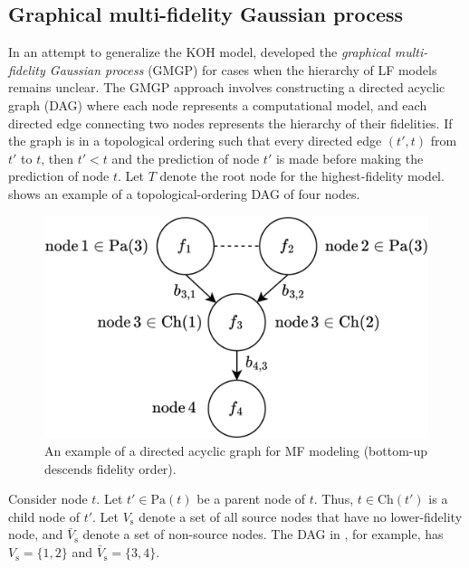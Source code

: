 \documentclass[iicol,sn-basic]{sn-jnl}%
\begin{document}
\subsection{Graphical multi-fidelity Gaussian process}\label{Sec43}

In an attempt to generalize the KOH model, \cite{Ji2023} developed the \textit{graphical multi-fidelity Gaussian process} (GMGP) for cases when the hierarchy of LF models remains unclear.
The GMGP approach involves constructing a directed acyclic graph (DAG) where each node represents a computational model, and each directed edge connecting two nodes represents the hierarchy of their fidelities.
If the graph is in a topological ordering such that every directed edge $(t',t)$ from $t'$ to $t$, then $t'<t$ and the prediction of node $t'$ is made before making the prediction of node $t$.  
Let $T$ denote the root node for the highest-fidelity model.
 shows an example of a topological-ordering DAG of four nodes.

\begin{figure}
	\centering
	\includegraphics[scale=0.85]{Fig6.png}
	\caption{An example of a directed acyclic graph for MF modeling (bottom-up descends fidelity order).}
	\label{Fig6}
\end{figure}

Consider node $t$.
Let $t' \in \text{Pa}(t)$ be a parent node of $t$.
Thus, $t \in \text{Ch}(t')$ is a child node of $t'$.
Let $V_\text{s}$ denote a set of all source nodes that have no lower-fidelity node, and $\bar{V}_\text{s}$ denote a set of non-source nodes.
The DAG in , for example, has $V_\text{s}=\{1,2\}$ and $\bar{V}_\text{s}=\{3,4\}$.
\end{document}
